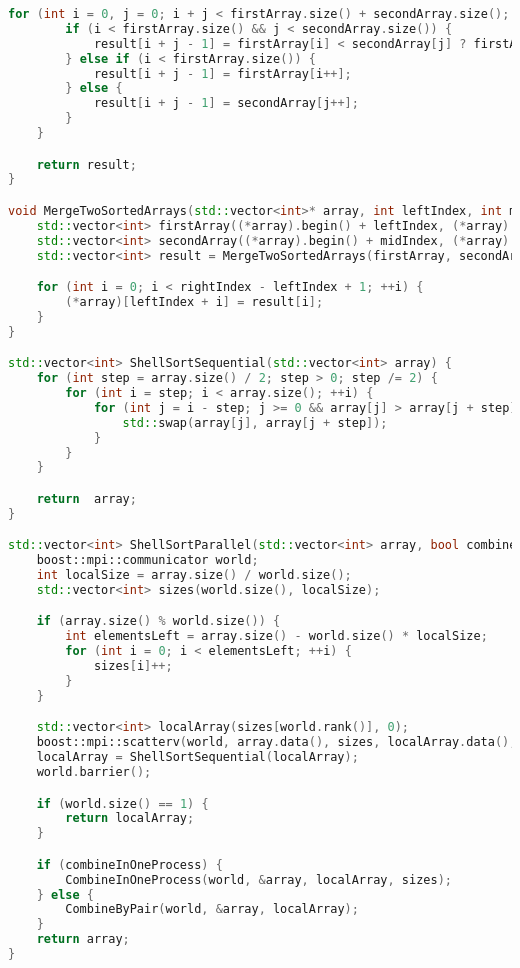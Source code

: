 \documentclass{report}
\begin{document}
\begin{lstlisting}[language=C++,caption=cpp файл]
    for (int i = 0, j = 0; i + j < firstArray.size() + secondArray.size(); ) {
        if (i < firstArray.size() && j < secondArray.size()) {
            result[i + j - 1] = firstArray[i] < secondArray[j] ? firstArray[i++]: secondArray[j++];
        } else if (i < firstArray.size()) {
            result[i + j - 1] = firstArray[i++];
        } else {
            result[i + j - 1] = secondArray[j++];
        }
    }

    return result;
}

void MergeTwoSortedArrays(std::vector<int>* array, int leftIndex, int midIndex, int rightIndex) {
    std::vector<int> firstArray((*array).begin() + leftIndex, (*array).begin() + midIndex);
    std::vector<int> secondArray((*array).begin() + midIndex, (*array).begin() + rightIndex + 1);
    std::vector<int> result = MergeTwoSortedArrays(firstArray, secondArray);

    for (int i = 0; i < rightIndex - leftIndex + 1; ++i) {
        (*array)[leftIndex + i] = result[i];
    }
}

std::vector<int> ShellSortSequential(std::vector<int> array) {
    for (int step = array.size() / 2; step > 0; step /= 2) {
        for (int i = step; i < array.size(); ++i) {
            for (int j = i - step; j >= 0 && array[j] > array[j + step]; j -= step) {
                std::swap(array[j], array[j + step]);
            }
        }
    }

    return  array;
}

std::vector<int> ShellSortParallel(std::vector<int> array, bool combineInOneProcess) {
    boost::mpi::communicator world;
    int localSize = array.size() / world.size();
    std::vector<int> sizes(world.size(), localSize);

    if (array.size() % world.size()) {
        int elementsLeft = array.size() - world.size() * localSize;
        for (int i = 0; i < elementsLeft; ++i) {
            sizes[i]++;
        }
    }

    std::vector<int> localArray(sizes[world.rank()], 0);
    boost::mpi::scatterv(world, array.data(), sizes, localArray.data(), 0);
    localArray = ShellSortSequential(localArray);
    world.barrier();

    if (world.size() == 1) {
        return localArray;
    }

    if (combineInOneProcess) {
        CombineInOneProcess(world, &array, localArray, sizes);
    } else {
        CombineByPair(world, &array, localArray);
    }
    return array;
}

\end{lstlisting}
\end{document}
